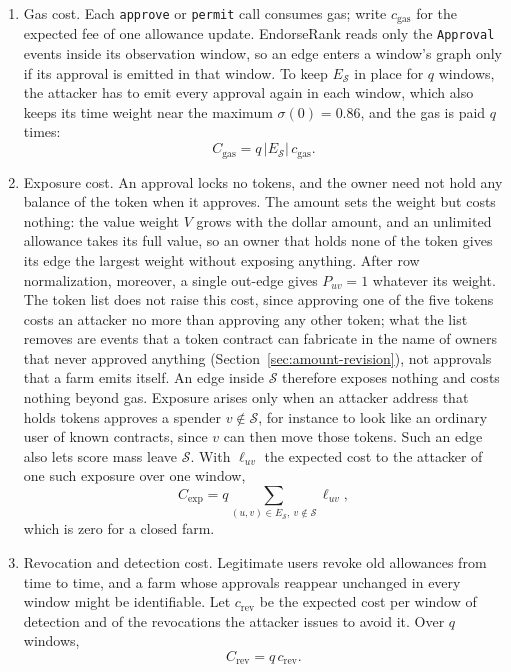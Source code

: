 \begin{enumerate}
\item Gas cost. Each \texttt{approve} or \texttt{permit} call consumes gas; write $c_{\mathrm{gas}}$ for the expected fee of one allowance update. EndorseRank reads only the \texttt{Approval} events inside its observation window, so an edge enters a window's graph only if its approval is emitted in that window. To keep $E_{\mathcal{S}}$ in place for $q$ windows, the attacker has to emit every approval again in each window, which also keeps its time weight near the maximum $\sigma(0)=0.86$, and the gas is paid $q$ times:
\begin{equation*}
C_{\mathrm{gas}} = q\,|E_{\mathcal{S}}|\,c_{\mathrm{gas}}.
\end{equation*}

\item Exposure cost. An approval locks no tokens, and the owner need not hold any balance of the token when it approves. The amount sets the weight but costs nothing: the value weight $V$ grows with the dollar amount, and an unlimited allowance takes its full value, so an owner that holds none of the token gives its edge the largest weight without exposing anything. After row normalization, moreover, a single out-edge gives $P_{uv}=1$ whatever its weight. The token list does not raise this cost, since approving one of the five tokens costs an attacker no more than approving any other token; what the list removes are events that a token contract can fabricate in the name of owners that never approved anything (Section~\ref{sec:amount-revision}), not approvals that a farm emits itself. An edge inside $\mathcal{S}$ therefore exposes nothing and costs nothing beyond gas. Exposure arises only when an attacker address that holds tokens approves a spender $v\notin\mathcal{S}$, for instance to look like an ordinary user of known contracts, since $v$ can then move those tokens. Such an edge also lets score mass leave $\mathcal{S}$. With $\ell_{uv}$ the expected cost to the attacker of one such exposure over one window,
\begin{equation*}
C_{\mathrm{exp}} = q\sum_{(u,v)\in E_{\mathcal{S}},\ v\notin\mathcal{S}} \ell_{uv},
\end{equation*}
which is zero for a closed farm.

\item Revocation and detection cost. Legitimate users revoke old allowances from time to time, and a farm whose approvals reappear unchanged in every window might be identifiable. Let $c_{\mathrm{rev}}$ be the expected cost per window of detection and of the revocations the attacker issues to avoid it. Over $q$ windows,
\begin{equation*}
C_{\mathrm{rev}} = q\,c_{\mathrm{rev}}.
\end{equation*}


\end{enumerate}
